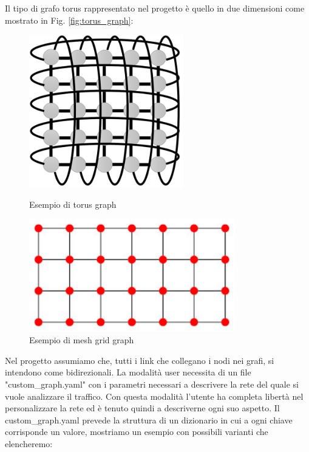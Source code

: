 \documentclass[binding=0.6cm]{sapthesis}
\begin{document}
Il tipo di grafo torus \cite{TorusWikipedia2024} rappresentato nel progetto è quello in due dimensioni come mostrato in Fig. \ref{fig:torus_graph}:

\begin{figure}[ht]
    \centering
    \begin{minipage}{0.48\textwidth}
        \centering
        \includegraphics[width=0.6\textwidth]{immagini/torus_graph.png}
        \caption{Esempio di torus graph \cite{torusgraph}}
        \label{fig:torus_graph}
    \end{minipage}\hfill
    \begin{minipage}{0.48\textwidth}
        \centering
        \includegraphics[width=0.8\textwidth]{immagini/GridGraph.jpg}
        \caption{Esempio di mesh grid graph \cite{MathWorldGridGraph}}
        \label{fig:grid_graph}
    \end{minipage}
\end{figure}



Nel progetto assumiamo che, tutti i link che collegano i nodi nei grafi, si intendono come bidirezionali. 
La modalità user necessita di un file "custom\_graph.yaml" con i parametri 
necessari a descrivere la rete del quale si vuole analizzare il traffico. 
Con questa modalità l'utente ha completa libertà nel personalizzare la rete ed 
è tenuto quindi a descriverne ogni suo aspetto. Il custom\_graph.yaml prevede la 
struttura di un dizionario in cui a ogni chiave corrisponde un valore, mostriamo un esempio con possibili varianti che elencheremo:
\end{document}
